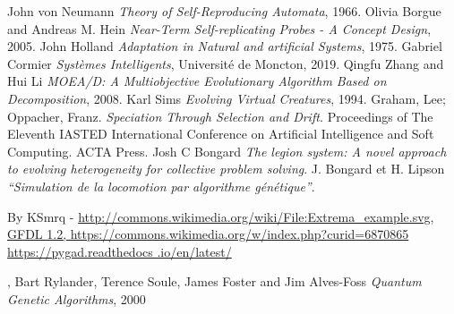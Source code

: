 \documentclass[journal, a4paper]{IEEEtran}
\begin{document}
%
%
%
%
\begin{thebibliography}{99}
	 John von Neumann
	\textit{Theory of Self-Reproducing Automata}, 1966.
	 Olivia Borgue and Andreas M.
	Hein \textit{Near-Term Self-replicating Probes - A Concept Design}, 2005.
	 John Holland \textit{Adaptation in
	Natural
	and artificial Systems}, 1975.
	 Gabriel Cormier \textit{Systèmes Intelligents}, Université de Moncton, 2019.
	 Qingfu Zhang and Hui Li \textit{MOEA/D: A Multiobjective Evolutionary Algorithm Based on Decomposition}, 2008.
	 Karl Sims \textit{Evolving Virtual Creatures}, 1994.
	 Graham, Lee; Oppacher, Franz. \textit{
	Speciation Through Selection and Drift. } Proceedings of The Eleventh IASTED International Conference on Artificial Intelligence and Soft Computing. ACTA Press.
	 Josh C Bongard \textit{The legion
	system: A novel approach to evolving heterogeneity for collective problem solving}.
	 J. Bongard et H. Lipson \textit{“Simulation de la locomotion par algorithme génétique”}.

	 By KSmrq -  \url{http://commons.wikimedia.org/wiki/File:Extrema_example.svg, GFDL 1.2, https://commons.wikimedia.org/w/index.php?curid=6870865}
	 \url{https://pygad.readthedocs
	.io/en/latest/}

	 , Bart Rylander, Terence Soule,
	James Foster and Jim Alves-Foss \textit{Quantum Genetic Algorithms}, 2000
\end{thebibliography}

%
%



\end{document}
